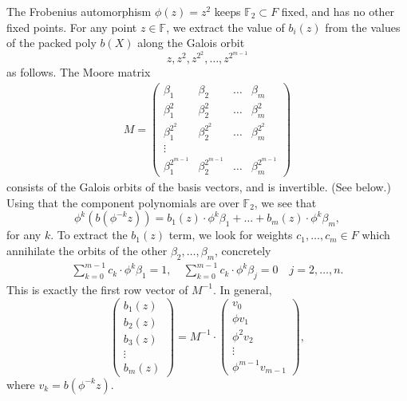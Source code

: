 The Frobenius automorphism $\phi(z) = z^2$ keeps $\mathbb F_2\subset F$ fixed, and has no other fixed points. 
For any point $z\in \mathbb F$, we extract the value of $b_i(z)$ from the values of the packed poly $b(X)$ along the Galois orbit 
\[
z, z^2, z^{2^2}, \ldots, z^{2^{m-1}}
\]
as follows.
%
The Moore matrix
\begin{align*}
M = \begin{pmatrix}
\beta_1 & \beta_2 & \ldots & \beta_m
\\
\beta_1^2 & \beta_2^2 & \ldots & \beta_m^2
\\
\beta_1^{2^2} & \beta_2^{2^2} & \ldots & \beta_m^{2^2}
\\
\vdots
\\
\beta_1^{2^{m-1}} & \beta_2^{2^{m-1}} & \ldots & \beta_m^{2^{m-1}}
\end{pmatrix}
\end{align*}
consists of the Galois orbits of the basis vectors, and is invertible. (See below.)
Using that the component polynomials are over $\mathbb F_2$, we see that
\[
\phi^{k} \left(b(\phi^{-k} z)\right) = b_1(z) \cdot \phi^{k}\beta_1 + \ldots + b_m(z) \cdot \phi^{k}\beta_m,
\]
for any $k$. 
To extract the $b_1(z)$ term, we look for weights $c_1,\ldots, c_m\in F$ which annihilate the orbits of the other $\beta_2,\ldots, \beta_m$, concretely
\begin{align*}
\sum_{k=0}^{m-1} c_k \cdot \phi^k \beta_1 = 1,
\quad 
\sum_{k=0}^{m-1} c_k \cdot \phi^k \beta_j = 0 \quad j=2,\ldots,n.
\end{align*}
This is exactly the first row vector of $M^{-1}$. 
%
In general, 
\[
\begin{pmatrix}
b_1(z)
\\
b_2(z)
\\
b_3(z)
\\
\vdots
\\
b_m(z)
\end{pmatrix}
= M^{-1}\cdot 
\begin{pmatrix}
v_0
\\
\phi v_1
\\
\phi^2 v_2
\\
\vdots
\\
\phi^{m-1} v_{m-1}
\end{pmatrix},
\]
where $v_k = b(\phi^{-k} z)$.




